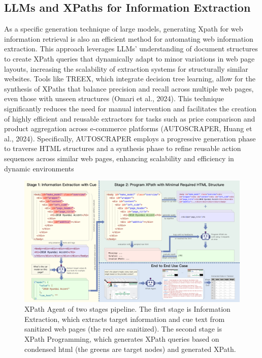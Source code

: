 \documentclass[a4paper]{article}
\begin{document}
\subsection{LLMs and XPaths for Information Extraction}
  As a specific generation technique of large models, generating Xpath for web information retrieval is also an efficient method for automating web information extraction. This approach leverages LLMs’ understanding of document structures to create XPath queries that dynamically adapt to minor variations in web page layouts, increasing the scalability of extraction systems for structurally similar websites. Tools like TREEX, which integrate decision tree learning, allow for the synthesis of XPaths that balance precision and recall across multiple web pages, even those with unseen structures (Omari et al., 2024). This technique significantly reduces the need for manual intervention and facilitates the creation of highly efficient and reusable extractors for tasks such as price comparison and product aggregation across e-commerce platforms (AUTOSCRAPER, Huang et al., 2024). Specifically, AUTOSCRAPER employs a progressive generation phase to traverse HTML structures and a synthesis phase to refine reusable action sequences across similar web pages, enhancing scalability and efficiency in dynamic environments
\begin{figure}[h]
  \centering
  \includegraphics[width=1\textwidth]{./workflow.png}
  \caption{XPath Agent of two stages pipeline. The first stage is Information Extraction, which extracts target information and cue text from sanitized web pages (the red are sanitized). The second stage is XPath Programming, which generates XPath queries based on condensed html (the greens are target nodes) and generated XPath.}
  \label{fig:workflow}
  \vspace{20pt} %
\end{figure}
\end{document}
